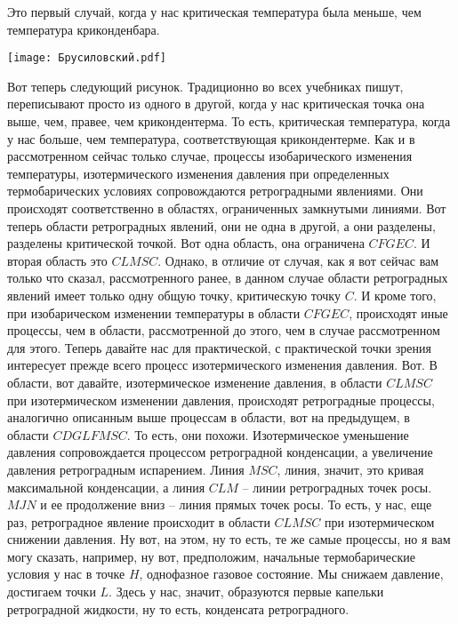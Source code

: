 \documentclass[main.tex]{subfiles}
\begin{document}
Это первый случай, когда у нас критическая температура
была меньше, чем температура криконденбара.

\begin{center}
\texttt{[image: Брусиловский.pdf]}
\end{center}

Вот теперь следующий рисунок.
Традиционно во всех учебниках пишут, переписывают просто из одного в другой, когда у нас критическая точка она выше, чем, правее, чем крикондентерма.
То есть, критическая температура, когда у нас больше, чем
температура, соответствующая крикондентерме.
Как и в рассмотренном сейчас только случае, процессы изобарического изменения температуры, изотермического изменения давления при определенных термобарических условиях сопровождаются ретроградными явлениями.
Они происходят соответственно в областях, ограниченных
замкнутыми линиями.
Вот теперь области ретроградных явлений, они не одна в другой, а они разделены, разделены критической точкой.
Вот одна область, она ограничена $CFGEC$.
И вторая область это $CLMSC$.
Однако, в отличие от случая, как я вот сейчас вам только
что сказал, рассмотренного ранее, в данном случае области
ретроградных явлений имеет только одну общую точку,
критическую точку $C$.
И кроме того, при изобарическом изменении температуры в области $CFGEC$, происходят иные процессы, чем в области, рассмотренной до этого, чем в случае рассмотренном для этого.
Теперь давайте нас для практической, с практической точки зрения интересует прежде всего процесс изотермического изменения давления.
Вот.
В области, вот давайте, изотермическое изменение давления, в области $CLMSC$ при изотермическом изменении давления, происходят ретроградные процессы, аналогично описанным выше процессам в области, вот на предыдущем, в области $CDGLFMSC$.
То есть, они похожи.
Изотермическое уменьшение давления сопровождается процессом ретроградной конденсации, а увеличение давления ретроградным испарением.
Линия $MSC$, линия, значит, это кривая максимальной конденсации, а линия $CLM$ -- линии ретроградных точек росы.
$MJN$ и ее продолжение вниз -- линия прямых точек росы.
То есть, у нас, еще раз, ретроградное явление происходит в области $CLMSC$ при изотермическом снижении давления.
Ну вот, на этом, ну то есть, те же самые процессы, но
я вам могу сказать, например, ну вот, предположим, начальные термобарические условия у нас в точке $H$, однофазное газовое состояние.
Мы снижаем давление, достигаем точки $L$.
Здесь у нас, значит, образуются первые капельки ретроградной жидкости, ну то есть, конденсата ретроградного.
\end{document}
